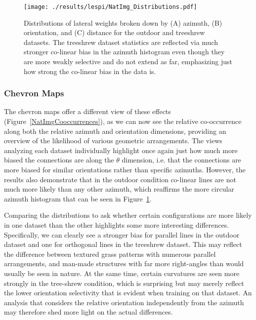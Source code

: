 \begin{figure}
	\centering
        \texttt{[image: ./results/lespi/NatImg\_Distributions.pdf]}
	\caption[Distributions of lateral weights broken down by azimuth,
      orientation, and distance.]{Distributions of lateral weights
      broken down by (A) azimuth, (B) orientation, and (C) distance
      for the outdoor and treeshrew datasets. The treeshrew dataset
      statistics are reflected via much stronger co-linear bias in the
      azimuth histogram even though they are more weakly selective and
      do not extend as far, emphasizing just how strong the co-linear
      bias in the data is.}
	\label{NatImgDistributions}
\end{figure}

\subsubsection*{Chevron Maps}

The chevron maps offer a different view of these effects
(Figure~\ref{NatImgCooccurrences}), as we can now see the relative
co-occurrence along both the relative azimuth and orientation
dimensions, providing an overview of the likelihood of various
geometric arrangements. The views analyzing each dataset individually
highlight once again just how much more biased the connections are
along the $\theta$ dimension, i.e. that the connections are more
biased for similar orientations rather than specific
azimuths. However, the results also demonstrate that in the outdoor
condition co-linear lines are not much more likely than any other
azimuth, which reaffirms the more circular azimuth histogram that can
be seen in Figure~\ref{NatImgDistributions}.

Comparing the distributions to ask whether certain configurations are
more likely in one dataset than the other highlights some more
interesting differences.  Specifically, we can clearly see a stronger
bias for parallel lines in the outdoor dataset and one for orthogonal
lines in the treeshrew dataset. This may reflect the difference
between textured grass patterns with numerous parallel arrangements,
and man-made structures with far more right-angles than would usually
be seen in nature. At the same time, certain curvatures are seen more
strongly in the tree-shrew condition, which is surprising but may
merely reflect the lower orientation selectivity that is evident when
training on that dataset. An analysis that considers the relative
orientation independently from the azimuth may therefore shed more
light on the actual differences.

